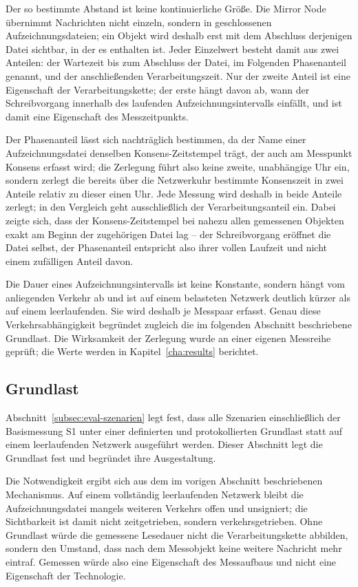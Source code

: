 Der so bestimmte Abstand ist keine kontinuierliche Größe. Die Mirror Node übernimmt Nachrichten nicht einzeln, sondern in geschlossenen Aufzeichnungsdateien; ein Objekt wird deshalb erst mit dem Abschluss derjenigen Datei sichtbar, in der es enthalten ist. Jeder Einzelwert besteht damit aus zwei Anteilen: der Wartezeit bis zum Abschluss der Datei, im Folgenden Phasenanteil genannt, und der anschließenden Verarbeitungszeit. Nur der zweite Anteil ist eine Eigenschaft der Verarbeitungskette; der erste hängt davon ab, wann der Schreibvorgang innerhalb des laufenden Aufzeichnungsintervalls einfällt, und ist damit eine Eigenschaft des Messzeitpunkts.

Der Phasenanteil lässt sich nachträglich bestimmen, da der Name einer Aufzeichnungsdatei denselben Konsens-Zeitstempel trägt, der auch am Messpunkt Konsens erfasst wird; die Zerlegung führt also keine zweite, unabhängige Uhr ein, sondern zerlegt die bereits über die Netzwerkuhr bestimmte Konsenszeit in zwei Anteile relativ zu dieser einen Uhr. Jede Messung wird deshalb in beide Anteile zerlegt; in den Vergleich geht ausschließlich der Verarbeitungsanteil ein. Dabei zeigte sich, dass der Konsens-Zeitstempel bei nahezu allen gemessenen Objekten exakt am Beginn der zugehörigen Datei lag -- der Schreibvorgang eröffnet die Datei selbst, der Phasenanteil entspricht also ihrer vollen Laufzeit und nicht einem zufälligen Anteil davon.

Die Dauer eines Aufzeichnungsintervalls ist keine Konstante, sondern hängt vom anliegenden Verkehr ab und ist auf einem belasteten Netzwerk deutlich kürzer als auf einem leerlaufenden. Sie wird deshalb je Messpaar erfasst. Genau diese Verkehrsabhängigkeit begründet zugleich die im folgenden Abschnitt beschriebene Grundlast. Die Wirksamkeit der Zerlegung wurde an einer eigenen Messreihe geprüft; die Werte werden in Kapitel~\ref{cha:results} berichtet.

\subsection{Grundlast}
\label{subsec:impl-grundlast}

Abschnitt~\ref{subsec:eval-szenarien} legt fest, dass alle Szenarien einschließlich der Basismessung S1 unter einer definierten und protokollierten Grundlast statt auf einem leerlaufenden Netzwerk ausgeführt werden. Dieser Abschnitt legt die Grundlast fest und begründet ihre Ausgestaltung.

Die Notwendigkeit ergibt sich aus dem im vorigen Abschnitt beschriebenen Mechanismus. Auf einem vollständig leerlaufenden Netzwerk bleibt die Aufzeichnungsdatei mangels weiteren Verkehrs offen und unsigniert; die Sichtbarkeit ist damit nicht zeitgetrieben, sondern verkehrsgetrieben. Ohne Grundlast würde die gemessene Lesedauer nicht die Verarbeitungskette abbilden, sondern den Umstand, dass nach dem Messobjekt keine weitere Nachricht mehr eintraf. Gemessen würde also eine Eigenschaft des Messaufbaus und nicht eine Eigenschaft der Technologie.

